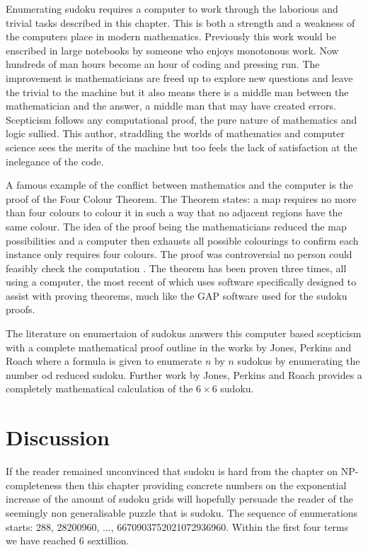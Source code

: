 \documentclass[a4paper,11pt]{report}
\newcounter{col}
\begin{document}
Enumerating sudoku requires a computer to work through the laborious and trivial tasks described in this chapter. This is both a strength and a weakness of the computers place in modern mathematics. Previously this work would be enscribed in large notebooks by someone who enjoys monotonous work. Now hundreds of man hours become an hour of coding and pressing run. The improvement is mathematicians are freed up to explore new questions and leave the trivial to the machine but it also means there is a middle man between the mathematician and the answer, a middle man that may have created errors. Scepticism follows any computational proof, the pure nature of mathematics and logic sullied. This author, straddling the worlds of mathematics and computer science sees the merits of the machine but too feels the lack of satisfaction at the inelegance of the code. 

A famous example of the conflict between mathematics and the computer is the proof of the Four Colour Theorem. The Theorem states: a map requires no more than four colours to colour it in such a way that no adjacent regions have the same colour. The idea of the proof being the mathematicians reduced the map possibilities and a computer then exhausts all possible colourings to confirm each instance only requires four colours. The proof was controversial no person could feasibly check the computation \cite{swart1980philosophical}. The theorem has been proven three times\cite{appel1989every}\cite{BarNatan1996LieAA}\cite{gonthier2008formal}, all using a computer, the most recent of which uses software specifically designed to assist with proving theorems, much like the GAP software used for the sudoku proofs. 

The literature on enumertaion of sudokus answers this computer based scepticism with a complete mathematical proof outline in the works by Jones, Perkins and Roach \cite{mima2013number} where a formula is given to enumerate $n$ by $n$ sudokus by enumerating the number od reduced sudoku. Further work by Jones, Perkins and Roach \cite{jones2014number} provides a completely mathematical calculation of the $6\times6$ sudoku.

\section{Discussion}

If the reader remained unconvinced that sudoku is hard from the chapter on NP-completeness then this chapter providing concrete numbers on the exponential increase of the amount of sudoku grids will hopefully persuade the reader of the seemingly non generalisable puzzle that is sudoku. The sequence of enumerations starts: 288, 28200960, ..., 6670903752021072936960. Within the first four terms we have reached 6 sextillion. 
\end{document}

